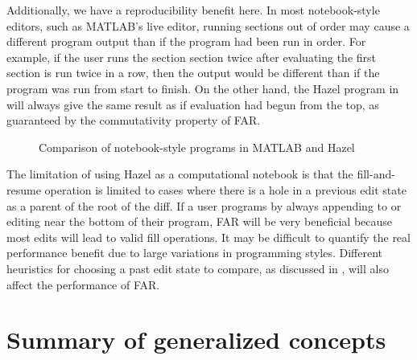Additionally, we have a reproducibility benefit here. In most notebook-style editors, such as MATLAB's live editor, running sections out of order may cause a different program output than if the program had been run in order. For example, if the user runs the section section twice after evaluating the first section  is run twice in a row, then the output would be different than if the program was run from start to finish. On the other hand, the Hazel program in  will always give the same result as if evaluation had begun from the top, as guaranteed by the commutativity property of FAR.

\begin{figure}
  \centering
  \begin{singlespace}
  \end{singlespace}
  \caption{Comparison of notebook-style programs in MATLAB and Hazel}
  \label{fig:notebook-comparison}
\end{figure}

The limitation of using Hazel as a computational notebook is that the fill-and-resume operation is limited to cases where there is a hole in a previous edit state as a parent of the root of the diff. If a user programs by always appending to or editing near the bottom of their program, FAR will be very beneficial because most edits will lead to valid fill operations. It may be difficult to quantify the real performance benefit due to large variations in programming styles. Different heuristics for choosing a past edit state to compare, as discussed in , will also affect the performance of FAR.

\section{Summary of generalized concepts}
\label{sec:summary-generalizations}

